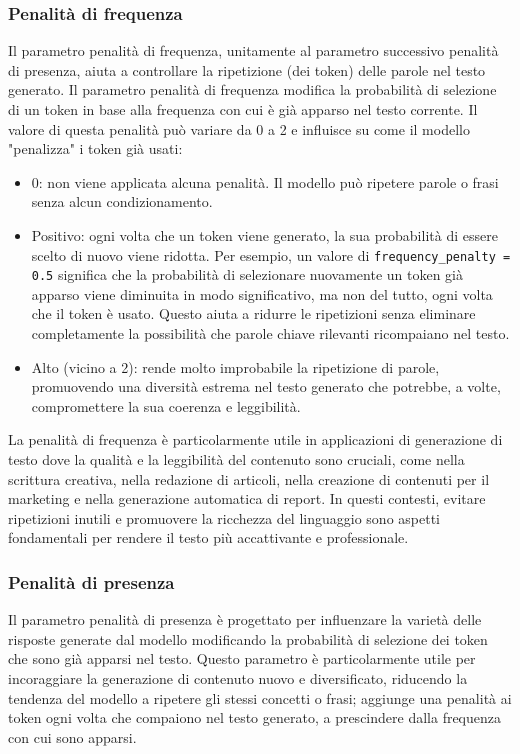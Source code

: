         \subsubsection{Penalità di frequenza}
            Il parametro penalità di frequenza, unitamente al parametro successivo penalità di presenza, aiuta a controllare la ripetizione (dei token) delle parole nel testo generato. Il parametro penalità di frequenza modifica la probabilità di selezione di un token in base alla frequenza con cui è già apparso nel testo corrente. Il valore di questa penalità può variare da 0 a 2 e influisce su come il modello "penalizza" i token già usati:
            \begin{itemize}
                \item 0: non viene applicata alcuna penalità. Il modello può ripetere parole o frasi senza alcun condizionamento.
            
                \item Positivo: ogni volta che un token viene generato, la sua probabilità di essere scelto di nuovo viene ridotta. Per esempio, un valore di \texttt{frequency\_penalty = 0.5} significa che la probabilità di selezionare nuovamente un token già apparso viene diminuita in modo significativo, ma non del tutto, ogni volta che il token è usato. Questo aiuta a ridurre le ripetizioni senza eliminare completamente la possibilità che parole chiave rilevanti ricompaiano nel testo.
            
                \item Alto (vicino a 2): rende molto improbabile la ripetizione di parole, promuovendo una diversità estrema nel testo generato che potrebbe, a volte, compromettere la sua coerenza e leggibilità.
            \end{itemize}
            
            La penalità di frequenza è particolarmente utile in applicazioni di generazione di testo dove la qualità e la leggibilità del contenuto sono cruciali, come nella scrittura creativa, nella redazione di articoli, nella creazione di contenuti per il marketing e nella generazione automatica di report. In questi contesti, evitare ripetizioni inutili e promuovere la ricchezza del linguaggio sono aspetti fondamentali per rendere il testo più accattivante e professionale.
            
        \subsubsection{Penalità di presenza}
            Il parametro penalità di presenza è progettato per influenzare la varietà delle risposte generate dal modello modificando la probabilità di selezione dei token che sono già apparsi nel testo. Questo parametro è particolarmente utile per incoraggiare la generazione di contenuto nuovo e diversificato, riducendo la tendenza del modello a ripetere gli stessi concetti o frasi; aggiunge una penalità ai token ogni volta che compaiono nel testo generato, a prescindere dalla frequenza con cui sono apparsi.

